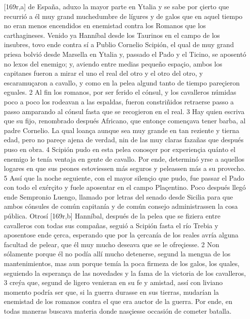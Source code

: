 \documentclass[11pt,twoside]{article}\makeatletter
\def\persName{}\def\name{}
\def\placeName{}
\begin{document}
[169r,a] de  {\placeName España}, aduxo la mayor parte en Ytalia y se sabe por çierto que recurrió a él muy grand muchedumbre de lígures y de galos que en aquel tiempo no eran menos encendidos en enemistad contra los  {\name Romanos} que los  {\name carthagineses}.
\pend
{} Venido ya  {\persName Hanníbal} desde los Taurinos en el campo de los insubres, tovo ende contra sí a Publio Cornelio Scipión, el qual de muy grand priesa bolvió desde Marsella en Ytalia y, passado el Pado y el Ticino, se aposentó no lexos del enemigo; y, aviendo entre medias pequeño espaçio, ambos los capitanes fueron a mirar el uno el real del otro y el otro del otro, y escaramuçaron a cavallo, y como en la pelea algund tanto de tiempo pareçieron eguales. 2 Al fin los romanos, por ser ferido el cónsul, y los cavalleros númidas poco a poco los rodeavan a las espaldas, fueron constriñidos retraerse passo a passo amparando al cónsul fasta que se recogieron en el real. 3 Hay quien escriva que su fijo, renombrado después Africano, que entonçe començava tener barba,  al padre Cornelio. La qual loança aunque sea muy grande en tan reziente y tierna edad, pero no pareçe ajena de verdad, nin de las muy claras fazañas que después puso en obra. 4 Scipión pudo en esta pelea conosçer por experiençia quánto el enemigo le tenía ventaja en gente de cavallo. Por ende, determinó yrse a aquellos logares en que sus peones estoviessen más seguros y peleassen más a su provecho. 5 Assí que la noche seguiente, con el mayor silençio que pudo, fue passar el Pado con todo el exérçito y fuele aposentar en el campo Plaçentino. Poco después llegó ende  Sempronio Luengo, llamado por letras del senado desde  {\placeName Sicilia} para que ambos cónsules de común capitanía y de común consejo administrassen la cosa pública.
\pend
{} Otrosí %
[169r,b]  {\persName Hanníbal}, después de la pelea que se fiziera entre cavalleros con todas sus compañas, seguió a Scipión fasta el río Trebia y aposentose ende çerca, esperando que por la çercanía de los reales avría alguna facultad de pelear, que él muy mucho deseava que se le ofreçiesse. 2 Non sólamente porque él no podía allí mucho detenerse, segund la mengua de los mantenimientos, mas aun porque temía la poca firmeza de los galos, los quales, seguiendo la esperança de las novedades y la fama de la victoria de los cavalleros, 3 creýa que, segund de ligero venieran en su fe y amistad, assí con liviano momento podría ser que, si la guerra durasse en sus tierras, mudarían la enemistad de los romanos contra el que era auctor de la guerra. Por ende, en todas maneras buscava materia donde nasçiesse occasión de cometer batalla.
\end{document}
